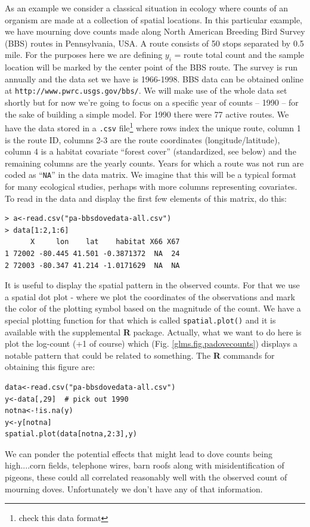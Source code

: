 As an example we consider a classical situation in ecology where
counts of an organism are made at a collection of spatial
locations. In this particular example, we have mourning dove counts
made along North American Breeding Bird Survey (BBS) routes in
Pennsylvania, USA. A route consists of 50 stops separated by 0.5
mile. For the purposes here we are defining $y_i$ = route total count
and the sample location will be marked by the center point of the BBS
route.  The survey is run annually and the data set we have is
1966-1998. BBS data can be obtained online at \mbox{\tt http:\//\//www.pwrc.usgs.gov\//bbs\//}.
We will make use of the whole data set shortly but for now we're going
to focus on a specific year of counts -- 1990 -- for the sake of
building a simple model.
 For 1990 there were 77 active routes. We have the data stored
in a \mbox{\tt .csv} file\footnote{check this data format} where rows index the unique route, column 1 is the
route ID, columns 2-3 are the route coordinates (longitude/latitude),
column 4 is a habitat covariate ``forest cover'' (standardized, see
below) and the remaining columns are the yearly counts. Years for
which a route was not run are coded as ``\mbox{\tt NA}'' in the data matrix. We
imagine that this will be a typical format for many ecological
studies, perhaps with more columns representing covariates.  To read
in the data and display the first few elements of this matrix, do
this:
{\small
\begin{verbatim}
> a<-read.csv("pa-bbsdovedata-all.csv")
> data[1:2,1:6]
      X     lon    lat    habitat X66 X67
1 72002 -80.445 41.501 -0.3871372  NA  24
2 72003 -80.347 41.214 -1.0171629  NA  NA
\end{verbatim}
}

It is useful to display the spatial pattern in the observed counts. For that we use a
spatial dot plot - where we plot the coordinates of the observations
and mark the color of the plotting symbol based on the magnitude of
the count.  We have a special plotting function for that which is
called \mbox{\tt spatial.plot()} and it is available with the
supplemental {\bf R} package.
Actually, what we want to do here is plot the
log-count (+1 of course) which (Fig. \ref{glms.fig.padovecounts}) displays a notable pattern that could
be related to something. The {\bf R} commands for obtaining this figure are:
{\small
\begin{verbatim}
data<-read.csv("pa-bbsdovedata-all.csv")
y<-data[,29]  # pick out 1990
notna<-!is.na(y)
y<-y[notna]
spatial.plot(data[notna,2:3],y)
\end{verbatim}
}
 We can ponder the potential effects that
might lead to dove counts being high....corn fields, telephone wires,
barn roofs along with misidentification of pigeons, these could all
correlated reasonably well with the observed count of mourning doves.
Unfortunately we don't have any of that information.


